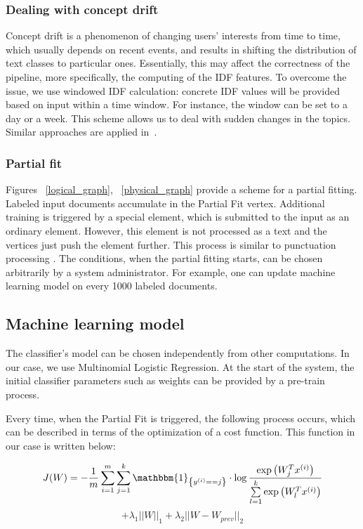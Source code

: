 \subsubsection{Dealing with concept drift}

Concept drift is a phenomenon of changing users' interests from time to time, which usually depends on recent events, and results in shifting the distribution of text classes to particular ones. Essentially, this may affect the correctness of the pipeline, more specifically, the computing of the IDF features. To overcome the issue, we use windowed IDF calculation: concrete IDF values will be provided based on input within a time window. For instance, the window can be set to a day or a week. This scheme allows us to deal with sudden changes in the topics. Similar approaches are applied in~\cite{klinkenberg2000detecting}.

\subsubsection{Partial fit}

Figures ~\ref{logical_graph}, ~\ref{physical_graph} provide a scheme for a partial fitting. Labeled input documents accumulate in the Partial Fit vertex. Additional training is triggered by a special element, which is submitted to the input as an ordinary element. However, this element is not processed as a text and the vertices just push the element further. This process is similar to punctuation processing \cite{tucker2003exploiting}. The conditions, when the partial fitting starts, can be chosen arbitrarily by a system administrator. For example, one can update machine learning model on every 1000 labeled documents.

\subsection{Machine learning model \label{ML}}

The classifier's model can be chosen independently from other computations. In our case, we use Multinomial Logistic Regression. At the start of the system, the initial classifier parameters such as weights can be provided by a pre-train process.

Every time, when the Partial Fit is triggered, the following process occurs, which can be described in terms of the optimization of a cost function. This function in our case is written below:

\begin{center}

$$ J(W) = -\frac{1}{m} \sum \limits_{i = 1}^{m} \sum \limits_{j = 1}^{k} \mathbbm{1}_{\left\{y^{(i)} == j\right\}} \cdot \log \frac{\exp\left({W_{j}^Tx^{(i)}}\right) }{\sum \limits_{l = 1}^{k}  \exp\left({W_{l}^Tx^{(i)}}\right) }$$ 
 $$ +  \lambda_1 ||W||_1 + \lambda_2 ||W - W_{prev}||_2 $$

\end{center} 

